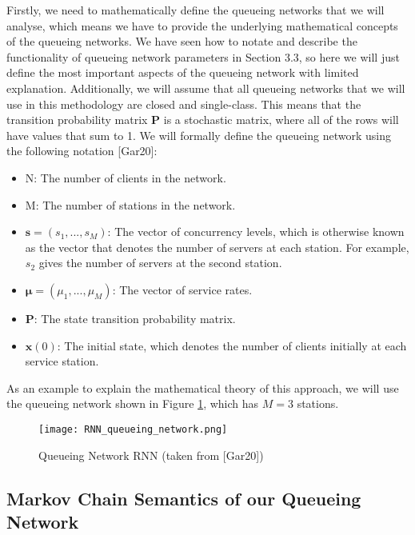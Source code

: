 \documentclass[a4paper,11pt,titlepage]{article}
\begin{document}
Firstly, we need to mathematically define the queueing networks that we will analyse, which means we have to provide the underlying mathematical concepts of the queueing networks. We have seen how to notate and describe the functionality of queueing network parameters in Section 3.3, so here we will just define the most important aspects of the queueing network with limited explanation. Additionally, we will assume that all queueing networks that we will use in this methodology are closed and single-class. This means that the transition probability matrix $\mathbf{P}$ is a stochastic matrix, where all of the rows will have values that sum to 1. We will formally define the queueing network using the following notation [Gar20]:

\begin{itemize}
    \item N: The number of clients in the network.
    \item M: The number of stations in the network.
    \item $\mathbf{s} = (s_1,...,s_M)$: The vector of concurrency levels, which is otherwise known as the vector that denotes the number of servers at each station. For example, $s_2$ gives the number of servers at the second station. 
    \item $\bm{\mu} = (\mu_1,...,\mu_M)$: The vector of service rates. 
    \item $\mathbf{P}$: The state transition probability matrix. 
    \item $\mathbf{x}(0)$: The initial state, which denotes the number of clients initially at each service station. 
\end{itemize}

As an example to explain the mathematical theory of this approach, we will use the queueing network shown in Figure \ref{fig:RNN_queue}, which has $M=3$ stations. 

\begin{figure}[h!]
\begin{center}
\texttt{[image: RNN\_queueing\_network.png]}
\caption{Queueing Network RNN (taken from [Gar20])}
\label{fig:RNN_queue}
\end{center}
\end{figure}

\subsection{Markov Chain Semantics of our Queueing Network}
\end{document}
